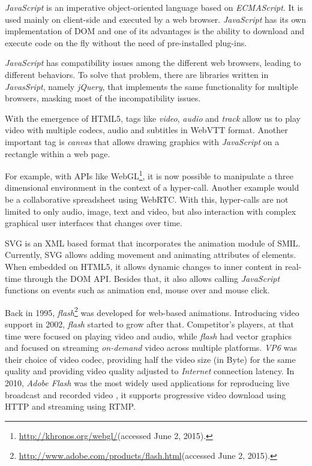   \emph{JavaScript} is an imperative object-oriented language based on \emph{ECMAScript}. It is used mainly on client-side and executed by a web browser. \emph{JavaScript} has its own implementation of \ac{DOM} and one of its advantages is the ability to download and execute code on the fly without the need of pre-installed plug-ins.

  \emph{JavaScript} has compatibility issues among the different web browsers, leading to different behaviors. To solve that problem, there are libraries written in \emph{JavasSript}, namely \emph{jQuery}, that implements the same functionality for multiple browsers, masking most of the incompatibility issues.

  With the emergence of \ac{HTML}5, tags like \emph{video}, \emph{audio} and \emph{track} allow us to play video with multiple codecs, audio and subtitles in \ac{WebVTT} format. Another important tag is \emph{canvas} that allows drawing graphics with \emph{JavaScript} on a rectangle within a web page.

  For example, with \ac{API}s like WebGL\footnote{\url{http://khronos.org/webgl/}(accessed June 2, 2015).}, it is now possible to manipulate a three dimensional environment in the context of a hyper-call. Another example would be a collaborative spreadsheet using \ac{WebRTC}. With this, hyper-calls are not limited to only audio, image, text and video, but also interaction with complex graphical user interfaces that changes over time.


  \ac{SVG} is an \ac{XML} based format that incorporates the animation module of \ac{SMIL}. Currently, \ac{SVG} allows adding movement and animating attributes of elements. When embedded on \ac{HTML}5, it allows dynamic changes to inner content in real-time through the \ac{DOM} \ac{API}. Besides that, it also allows calling \emph{JavaScript} functions on events such as animation end, mouse over and mouse click.
  
  Back in 1995, \emph{flash}\footnote{\url{http://www.adobe.com/products/flash.html}(accessed June 2, 2015).} was developed for web-based animations. Introducing video support in 2002, \emph{flash} started to grow after that. Competitor's players, at that time were focused on playing video and audio, while \emph{flash} had vector graphics and focused on streaming \emph{on-demand} video across multiple platforms. \emph{VP6} was their choice of video codec, providing half the video size (in Byte) for the same quality and providing video quality adjusted to \emph{Internet} connection latency. 
  In 2010, \emph{Adobe Flash} was the most widely used applications for reproducing live broadcast and recorded video \cite{flashvideo}, it supports progressive video download using \ac{HTTP} and streaming using \ac{RTMP}.

